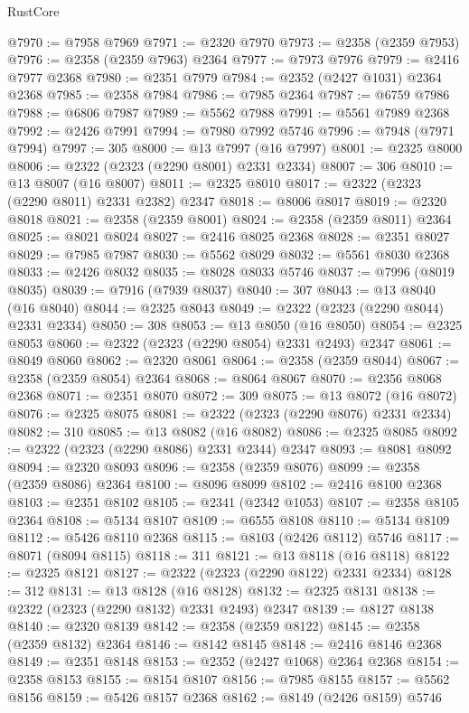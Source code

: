 \begin{lexlean}{RustCore}
\begin{coremodule}
@7970 := @7958 @7969
@7971 := @2320 @7970
@7973 := @2358 (@2359 @7953)
@7976 := @2358 (@2359 @7963) @2364
@7977 := @7973 @7976
@7979 := @2416 @7977 @2368
@7980 := @2351 @7979
@7984 := @2352 (@2427 @1031) @2364 @2368
@7985 := @2358 @7984
@7986 := @7985 @2364
@7987 := @6759 @7986
@7988 := @6806 @7987
@7989 := @5562 @7988
@7991 := @5561 @7989 @2368
@7992 := @2426 @7991
@7994 := @7980 @7992 @5746
@7996 := @7948 (@7971 @7994)
@7997 := 305
@8000 := @13 @7997 (@16 @7997)
@8001 := @2325 @8000
@8006 := @2322 (@2323 (@2290 @8001) @2331 @2334)
@8007 := 306
@8010 := @13 @8007 (@16 @8007)
@8011 := @2325 @8010
@8017 := @2322 (@2323 (@2290 @8011) @2331 @2382) @2347
@8018 := @8006 @8017
@8019 := @2320 @8018
@8021 := @2358 (@2359 @8001)
@8024 := @2358 (@2359 @8011) @2364
@8025 := @8021 @8024
@8027 := @2416 @8025 @2368
@8028 := @2351 @8027
@8029 := @7985 @7987
@8030 := @5562 @8029
@8032 := @5561 @8030 @2368
@8033 := @2426 @8032
@8035 := @8028 @8033 @5746
@8037 := @7996 (@8019 @8035)
@8039 := @7916 (@7939 @8037)
@8040 := 307
@8043 := @13 @8040 (@16 @8040)
@8044 := @2325 @8043
@8049 := @2322 (@2323 (@2290 @8044) @2331 @2334)
@8050 := 308
@8053 := @13 @8050 (@16 @8050)
@8054 := @2325 @8053
@8060 := @2322 (@2323 (@2290 @8054) @2331 @2493) @2347
@8061 := @8049 @8060
@8062 := @2320 @8061
@8064 := @2358 (@2359 @8044)
@8067 := @2358 (@2359 @8054) @2364
@8068 := @8064 @8067
@8070 := @2356 @8068 @2368
@8071 := @2351 @8070
@8072 := 309
@8075 := @13 @8072 (@16 @8072)
@8076 := @2325 @8075
@8081 := @2322 (@2323 (@2290 @8076) @2331 @2334)
@8082 := 310
@8085 := @13 @8082 (@16 @8082)
@8086 := @2325 @8085
@8092 := @2322 (@2323 (@2290 @8086) @2331 @2344) @2347
@8093 := @8081 @8092
@8094 := @2320 @8093
@8096 := @2358 (@2359 @8076)
@8099 := @2358 (@2359 @8086) @2364
@8100 := @8096 @8099
@8102 := @2416 @8100 @2368
@8103 := @2351 @8102
@8105 := @2341 (@2342 @1053)
@8107 := @2358 @8105 @2364
@8108 := @5134 @8107
@8109 := @6555 @8108
@8110 := @5134 @8109
@8112 := @5426 @8110 @2368
@8115 := @8103 (@2426 @8112) @5746
@8117 := @8071 (@8094 @8115)
@8118 := 311
@8121 := @13 @8118 (@16 @8118)
@8122 := @2325 @8121
@8127 := @2322 (@2323 (@2290 @8122) @2331 @2334)
@8128 := 312
@8131 := @13 @8128 (@16 @8128)
@8132 := @2325 @8131
@8138 := @2322 (@2323 (@2290 @8132) @2331 @2493) @2347
@8139 := @8127 @8138
@8140 := @2320 @8139
@8142 := @2358 (@2359 @8122)
@8145 := @2358 (@2359 @8132) @2364
@8146 := @8142 @8145
@8148 := @2416 @8146 @2368
@8149 := @2351 @8148
@8153 := @2352 (@2427 @1068) @2364 @2368
@8154 := @2358 @8153
@8155 := @8154 @8107
@8156 := @7985 @8155
@8157 := @5562 @8156
@8159 := @5426 @8157 @2368
@8162 := @8149 (@2426 @8159) @5746

\end{coremodule}
\end{lexlean}
